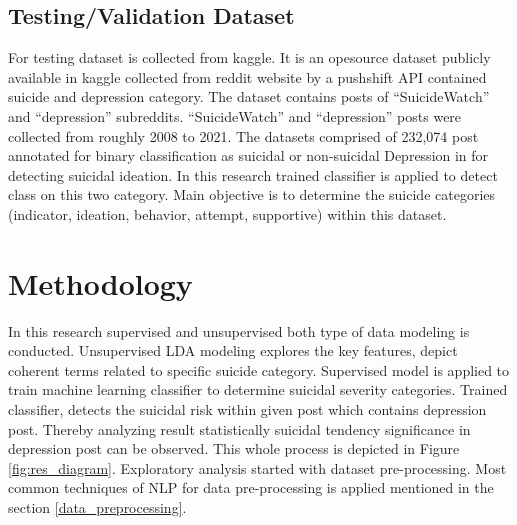 \documentclass[sn-mathphys,Numbered]{sn-jnl}%
\theoremstyle{thmstyleone}%
\theoremstyle{thmstyletwo}%
\theoremstyle{thmstylethree}%
\begin{document}
\subsection{Testing/Validation Dataset} 
For testing dataset is collected from kaggle. It is an opesource dataset publicly available in kaggle collected from reddit website by a pushshift API contained suicide and depression category. The dataset contains posts of \enquote{SuicideWatch} and \enquote{depression} subreddits. \enquote{SuicideWatch} and \enquote{depression} posts were collected from roughly 2008 to 2021. The datasets comprised of 232,074 post annotated for binary classification as suicidal or non-suicidal Depression in \cite{aldhyani2022detecting} for detecting suicidal ideation. In this research trained classifier is applied to detect class on this two category. Main objective is to determine the suicide categories (indicator, ideation, behavior, attempt, supportive) within this dataset. 


\section{Methodology}\label{methodolo}
In this research supervised and unsupervised both type of data modeling is conducted. Unsupervised LDA modeling explores the key features, depict coherent terms related to specific suicide category. Supervised model is applied to train machine learning classifier to determine suicidal severity categories. Trained classifier, detects the suicidal risk within given post which contains depression post. Thereby analyzing result statistically suicidal tendency significance in depression post can be observed. This whole process is depicted in Figure \ref{fig:res_diagram}. Exploratory analysis started with dataset pre-processing. Most common techniques of NLP for data pre-processing is applied mentioned in the section \ref{data_preprocessing}. 
\end{document}

